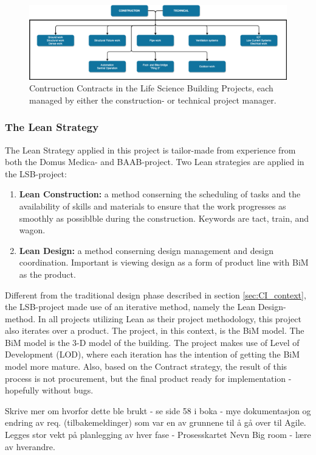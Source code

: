 \begin{figure}
    \centering
    \includegraphics[width=\textwidth]{fig/LVB_contracts.png}
    \caption{Contruction Contracts in the Life Science Building Projects, each managed by either the construction- or technical project manager.}
    \label{fig:project_contracts}
\end{figure}

\subsubsection*{The Lean Strategy}
The Lean Strategy applied in this project is tailor-made from experience from both the Domus Medica- and BAAB-project. Two Lean strategies are applied in the LSB-project: 

\begin{enumerate}
    \item \textbf{Lean Construction:} a method conserning the scheduling
    of tasks and the availability of skills and materials to ensure that the work progresses as smoothly as possiblble during the construction. Keywords are tact, train, and wagon.
    \item \textbf{Lean Design:} a method conserning design management and design coordination. Important is viewing design as a form of product line with BiM as the product.
\end{enumerate}

Different from the traditional design phase described in section \ref{sec:CI_context}, the LSB-project made use of an iterative method, namely the Lean Design-method. In all projects utilizing Lean as their project methodology, this project also iterates over a product. The project, in this context, is the BiM model. The BiM model is the 3-D model of the building. The project makes use of Level of Development (LOD), where each iteration has the intention of getting the BiM model more mature. Also, based on the Contract strategy, the result of this process is not procurement, but the final product ready for implementation - hopefully without bugs. 

Skrive mer om hvorfor dette ble brukt - se side 58 i boka - mye dokumentasjon og endring av req. (tilbakemeldinger) som var en av grunnene til å gå over til Agile.
Legges stor vekt på planlegging av hver fase - Prosesskartet
Nevn Big room - lære av hverandre.


